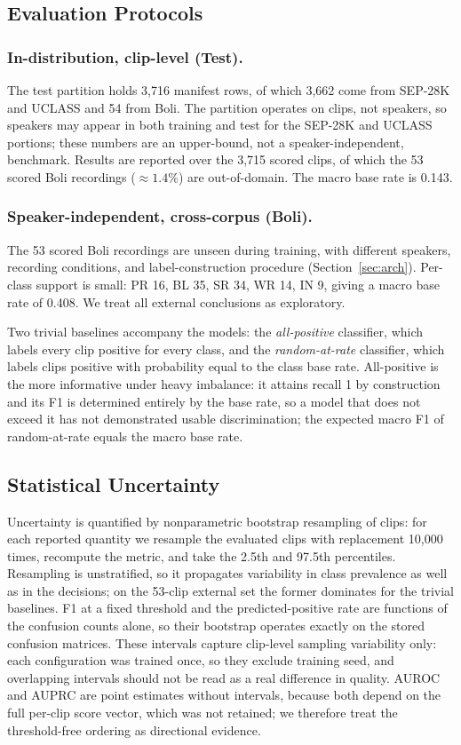 \documentclass[a4paper,orivec]{llncs}
\begin{document}
\subsection{Evaluation Protocols}
\subsubsection{In-distribution, clip-level (Test).}
The test partition holds 3{,}716 manifest rows, of which 3{,}662 come from
SEP-28K and UCLASS and 54 from Boli. The partition operates on clips, not
speakers, so speakers may appear in both training and test for the SEP-28K and
UCLASS portions; these numbers are an upper-bound, not a speaker-independent,
benchmark. Results are reported over the 3{,}715 scored clips, of which the 53
scored Boli recordings (${\approx}1.4\%$) are out-of-domain. The macro base rate
is 0.143.

\subsubsection{Speaker-independent, cross-corpus (Boli).}
The 53 scored Boli recordings are unseen during training, with different
speakers, recording conditions, and label-construction procedure
(Section~\ref{sec:arch}). Per-class support is small: PR 16, BL 35, SR 34, WR 14,
IN 9, giving a macro base rate of 0.408. We treat all external conclusions as
exploratory.

Two trivial baselines accompany the models: the \emph{all-positive} classifier,
which labels every clip positive for every class, and the \emph{random-at-rate}
classifier, which labels clips positive with probability equal to the class base
rate. All-positive is the more informative under heavy imbalance: it attains
recall 1 by construction and its F1 is determined entirely by the base rate, so a
model that does not exceed it has not demonstrated usable discrimination; the
expected macro F1 of random-at-rate equals the macro base rate.

\subsection{Statistical Uncertainty}
\label{sec:uncert}
Uncertainty is quantified by nonparametric bootstrap resampling of clips: for each
reported quantity we resample the evaluated clips with replacement 10{,}000 times,
recompute the metric, and take the 2.5th and 97.5th percentiles. Resampling is
unstratified, so it propagates variability in class prevalence as well as in the
decisions; on the 53-clip external set the former dominates for the trivial
baselines. F1 at a fixed threshold and the predicted-positive rate are functions
of the confusion counts alone, so their bootstrap operates exactly on the stored
confusion matrices. These intervals capture clip-level sampling variability only:
each configuration was trained once, so they exclude training seed, and
overlapping intervals should not be read as a real difference in quality. AUROC
and AUPRC are point estimates without intervals, because both depend on the full
per-clip score vector, which was not retained; we therefore treat the
threshold-free ordering as directional evidence.
\end{document}
